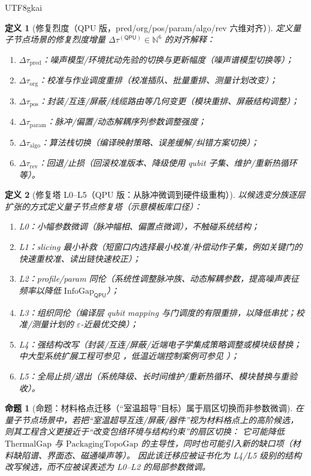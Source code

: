 \documentclass[12pt]{article}
\newtheorem{definition}{定义}[section]
\newtheorem{proposition}{命题}[section]
\newcommand{\NN}{\mathbb{N}}
\begin{document}
\begin{CJK*}{UTF8}{gkai}
\begin{definition}[修复烈度（QPU 版，pred/org/pos/param/algo/rev 六维对齐）]
\label{def:qpu-tau}
定义量子节点场景的修复烈度增量 $\Delta\tau^{(\mathsf{QPU})}\in\NN^6$ 的对齐解释：
\begin{enumerate}
  \item $\Delta\tau_{\mathrm{pred}}$：噪声模型/环境扰动先验的切换与更新幅度（噪声谱模型切换等）；
  \item $\Delta\tau_{\mathrm{org}}$：校准与作业调度重排（校准插队、批量重排、测量计划改变）；
  \item $\Delta\tau_{\mathrm{pos}}$：封装/互连/屏蔽/线缆路由等几何变更（模块重排、屏蔽结构调整）；
  \item $\Delta\tau_{\mathrm{param}}$：脉冲/偏置/动态解耦序列参数调整强度；
  \item $\Delta\tau_{\mathrm{algo}}$：算法栈切换（编译映射策略、误差缓解/纠错方案切换）；
  \item $\Delta\tau_{\mathrm{rev}}$：回退/止损（回滚校准版本、降级使用 qubit 子集、维护/重新热循环等）。
\end{enumerate}
\end{definition}

\begin{definition}[修复塔 L0--L5（QPU 版：从脉冲微调到硬件级重构）]
\label{def:qpu-repair-tower}
以候选变分族逐层扩张的方式定义量子节点修复塔（示意模板库口径）：
\begin{enumerate}
  \item L0：小幅参数微调（脉冲幅相、偏置点微调），不触碰系统结构；
  \item L1：slicing 最小补救（短窗口内选择最小校准/补偿动作子集，例如关键门的快速重校准、读出链快速校正）；
  \item L2：profile/param 同伦（系统性调整脉冲族、动态解耦参数，提高噪声表征频率以降低 $\mathrm{InfoGap}_{\mathsf{QPU}}$）；
  \item L3：组织同伦（编译层 qubit mapping 与门调度的有限重排，以降低串扰；校准/测量计划的 $\varepsilon$-近最优交换）；
  \item L4：强结构改写（封装/互连/屏蔽/近端电子学集成策略调整或模块级替换；中大型系统扩展工程可参见 \cite{ref_springer_epjqt_2019_0072_0}，低温近端控制案例可参见
    \cite{ref_nature_2025_09157_x}）；
  \item L5：全局止损/退出（系统降级、长时间维护/重新热循环、模块替换与重验收）。
\end{enumerate}
\end{definition}

\begin{proposition}[命题：材料格点迁移（“室温超导”目标）属于扇区切换而非参数微调]
\label{prop:qpu-roomtemp-sc-as-sector-switch}
在量子节点场景中，若把“室温超导互连/屏蔽/器件”视为材料格点上的高阶候选，
则其工程含义更接近于“改变包络环境与结构约束”的扇区切换：
它可能降低 $\mathrm{ThermalGap}$ 与 $\mathrm{PackagingTopoGap}$ 的主导性，同时也可能引入新的缺口项（材料缺陷谱、界面态、磁通噪声等）。
因此该迁移应被证书化为 L4/L5 级别的结构改写候选，而不应被误表述为 L0--L2 的局部参数微调。
\end{proposition}


\end{CJK*}
\end{document}
